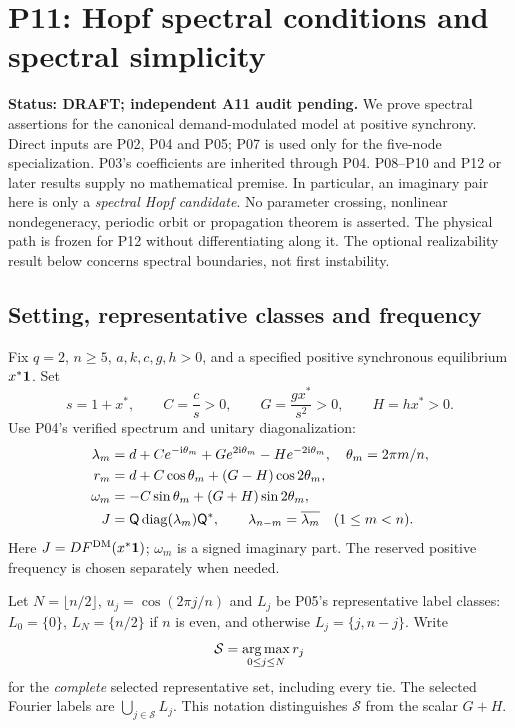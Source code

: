 \section{P11: Hopf spectral conditions and spectral simplicity}
\label{sec:P11}
\noindent\textbf{Status: DRAFT; independent A11 audit pending.}
We prove spectral assertions for the canonical demand-modulated model at
positive synchrony. Direct inputs are P02, P04 and P05; P07 is used only
for the five-node specialization. P03's coefficients are inherited through
P04. P08--P10 and P12 or later results supply no mathematical premise.
In particular, an imaginary pair here is only a \emph{spectral Hopf
candidate}. No parameter crossing, nonlinear nondegeneracy, periodic
orbit or propagation theorem is asserted. The physical path is frozen for
P12 without differentiating along it. The optional realizability result
below concerns spectral boundaries, not first instability.

\subsection{Setting, representative classes and frequency}
\label{slot:P11-1}
Fix $q=2$, $n\ge5$, $a,k,c,g,h>0$, and a specified positive synchronous
equilibrium $x^*\mathbf{1}$. Set
\begin{equation}
 s=1+x^*,\qquad C=\frac cs>0,\qquad
 G=\frac{gx^*}{s^2}>0,\qquad H=hx^*>0.
 \label{eq:P11-effective}
\end{equation}
Use P04's verified spectrum and unitary diagonalization:
\begin{align}
 \lambda_m&=d+Ce^{-\mathrm{i}\theta_m}+Ge^{2\mathrm{i}\theta_m}
                       -He^{-2\mathrm{i}\theta_m},\quad \theta_m=2\pi m/n,
                       \label{eq:P11-input}\\
 r_m&=d+C\cos\theta_m+(G-H)\cos2\theta_m,\nonumber\\
 \omega_m&=-C\sin\theta_m+(G+H)\sin2\theta_m,\nonumber\\
 J&=\mathsf{Q}\operatorname{diag}(\lambda_m)\mathsf{Q}^*,\qquad
 \lambda_{n-m}=\overline{\lambda_m}\quad(1\le m<n).\nonumber
\end{align}
Here $J=DF^{\mathrm{DM}}(x^*\mathbf{1})$; $\omega_m$ is a signed imaginary part.
The reserved positive frequency is chosen separately when needed.

Let $N=\lfloor n/2\rfloor$, $u_j=\cos(2\pi j/n)$ and
$L_j$ be P05's representative label classes: $L_0=\{0\}$,
$L_N=\{n/2\}$ if $n$ is even, and otherwise
$L_j=\{j,n-j\}$. Write
\[
 \mathcal S=\operatorname*{arg\,max}_{0\le j\le N}r_j
\]
for the \emph{complete} selected representative set, including every tie.
The selected Fourier labels are $\bigcup_{j\in\mathcal S}L_j$.
This notation distinguishes $\mathcal S$ from the scalar $G+H$.

